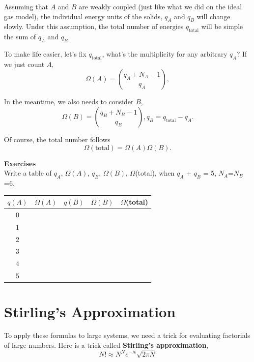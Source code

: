 Assuming that $A$ and $B$ are weakly coupled (just like what we did on the ideal gas model),
the individual energy units of the solids, $q_A$ and $q_B$ will change slowly.
Under this assumption, the total number of energies $q_\text {total}$ will be simple the sum of $q_A$ and $q_B$.

To make life easier, let's fix $q_\text{total}$, what's the multiplicity for any arbitrary $q_A$?
If we just count $A$,
\begin{equation}
 \Omega(A) = \binom{q_A+N_A-1}{q_A},
\end{equation}

In the meantime, we also needs to consider $B$, 
\begin{equation}
 \Omega(B) = \binom{q_B+N_B-1}{q_B},
 q_B = q_ \text {total} - q_A.
\end{equation}

Of course, the total number follows
\begin{equation}
 \Omega(\text {total}) = \Omega(A)\Omega(B).
\end{equation}

{\bf Exercises}\\
Write a table of $q_A$, $\Omega(A)$, $q_B$, $\Omega(B)$, $\Omega$(total), when $q_A$ + $q_B$ = 5, $N_A$=$N_B$=6.

\begin{table}[h]
\centering
\begin{tabular}{|c| c |c |c |c|}\hline
$q(A)$ & $\Omega(A)$ & $q(B)$ & $\Omega(B)$ & $\Omega$(total)\\\hline
    0  &             &        &             &  \\\hline
    1  &             &        &             &  \\\hline
    2  &             &        &             &  \\\hline
    3  &             &        &             &  \\\hline
    4  &             &        &             &  \\\hline
    5  &             &        &             &  \\\hline
\end{tabular}
\end{table}

\section{Stirling's Approximation}
To apply these formulas to large systems, we need a trick for evaluating factorials of large numbers. Here is a trick called {\bf Stirling's approximation},
\begin{equation}\label{stir}
  N! \approx N^N e^{-N} \sqrt{2\pi N}
\end{equation}

